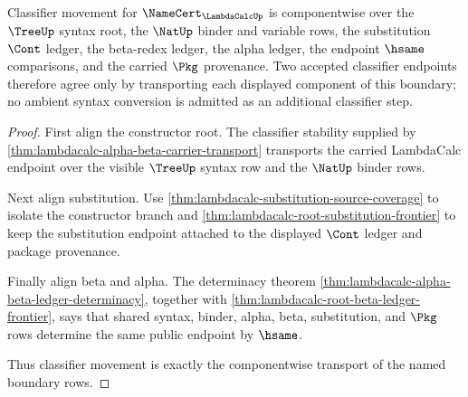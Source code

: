 \begin{theorem}
\label{thm:lambdacalc-namecert-classifier-boundary}
Classifier movement for $\NameCert_{\LambdaCalcUp}$ is componentwise over the $\TreeUp$ syntax root, the $\NatUp$ binder and variable rows, the substitution $\Cont$ ledger, the beta-redex ledger, the alpha ledger, the endpoint $\hsame$ comparisons, and the carried $\Pkg$ provenance. Two accepted classifier endpoints therefore agree only by transporting each displayed component of this boundary; no ambient syntax conversion is admitted as an additional classifier step.
\end{theorem}
\begin{proof}
First align the constructor root. The classifier stability supplied by \autoref{thm:lambdacalc-alpha-beta-carrier-transport} transports the carried LambdaCalc endpoint over the visible $\TreeUp$ syntax row and the $\NatUp$ binder rows.

Next align substitution. Use \autoref{thm:lambdacalc-substitution-source-coverage} to isolate the constructor branch and \autoref{thm:lambdacalc-root-substitution-frontier} to keep the substitution endpoint attached to the displayed $\Cont$ ledger and package provenance.

Finally align beta and alpha. The determinacy theorem \autoref{thm:lambdacalc-alpha-beta-ledger-determinacy}, together with \autoref{thm:lambdacalc-root-beta-ledger-frontier}, says that shared syntax, binder, alpha, beta, substitution, and $\Pkg$ rows determine the same public endpoint by $\hsame$.

Thus classifier movement is exactly the componentwise transport of the named boundary rows.
\end{proof}

